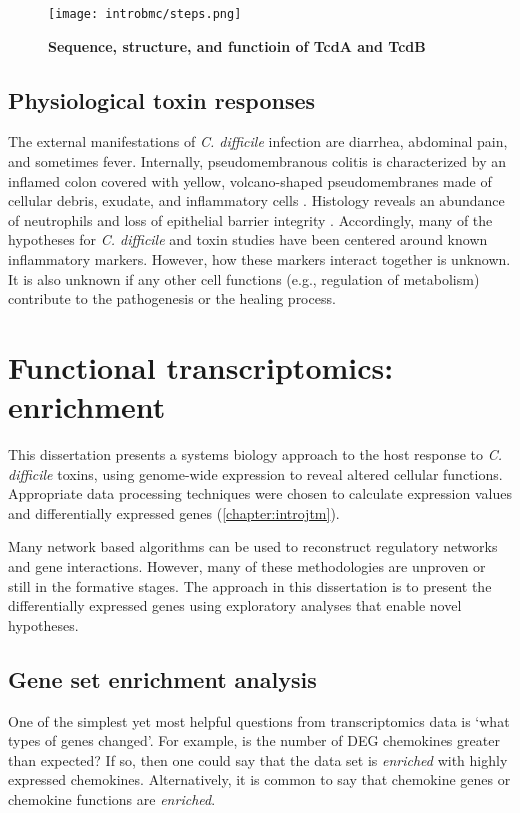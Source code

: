 \begin{figure}[h!]
  \centering
  \texttt{[image: introbmc/steps.png]}
  \caption{\textbf{Sequence, structure, and functioin of TcdA and TcdB}}
  \label{introbmc:steps}
\end{figure}

\subsection{Physiological toxin responses}
The external manifestations of \textit{C. difficile} infection 
are diarrhea, abdominal pain, and sometimes fever.
Internally, pseudomembranous colitis is characterized by
an inflamed colon covered with yellow, volcano-shaped 
pseudomembranes made of cellular debris, exudate,
and inflammatory cells \cite{Tedesco:1974jo}. 
Histology reveals an abundance of neutrophils and
loss of epithelial barrier integrity \cite{Lyerly:1988dk,Kelly:1994cu}.
Accordingly, many of the hypotheses for \textit{C. difficile}
and toxin studies have been centered around known inflammatory
markers. However, how these markers interact together
is unknown. It is also unknown if any other cell functions
(e.g., regulation of metabolism) contribute to the pathogenesis
or the healing process.


\section{Functional transcriptomics: enrichment}
This dissertation presents a systems biology approach
to the host response to \textit{C. difficile} toxins,
using genome-wide expression to reveal altered cellular functions.
Appropriate data processing techniques were chosen to calculate
expression values and differentially expressed genes (\autoref{chapter:introjtm}).

Many network based algorithms can be used to reconstruct regulatory networks
and gene interactions. However, many of these methodologies are unproven
or still in the formative stages. The approach in this dissertation
is to present the differentially expressed genes using exploratory analyses
that enable novel hypotheses.

\subsection{Gene set enrichment analysis}
One of the simplest yet most helpful questions from transcriptomics data is `what
types of genes changed'. For example, is the number of DEG chemokines 
greater than expected? If so, then one could say that the data
set is \textit{enriched} with highly expressed chemokines. Alternatively,
it is common to say that chemokine genes or chemokine functions
are \textit{enriched}.

